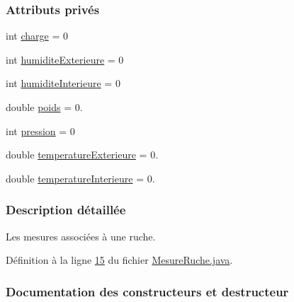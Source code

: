 \subsubsection*{Attributs privés}
\begin{DoxyCompactItemize}
\item 
int \hyperlink{classcom_1_1example_1_1bee__honeyt_1_1_mesure_ruche_a5ac02bc1d6195faa400e5a3171eed3f4}{charge} = 0
\item 
int \hyperlink{classcom_1_1example_1_1bee__honeyt_1_1_mesure_ruche_aa5521e97dfa98051bff9fd8d3ca3f34d}{humidite\+Exterieure} = 0
\item 
int \hyperlink{classcom_1_1example_1_1bee__honeyt_1_1_mesure_ruche_a3b5d2536649e0acaf1eebeba4409c9bb}{humidite\+Interieure} = 0
\item 
double \hyperlink{classcom_1_1example_1_1bee__honeyt_1_1_mesure_ruche_a9aa6c575b7b69c4fb3825944e1f50722}{poids} = 0.
\item 
int \hyperlink{classcom_1_1example_1_1bee__honeyt_1_1_mesure_ruche_ae78080a6d5745faa411e3cfbdbf8aeec}{pression} = 0
\item 
double \hyperlink{classcom_1_1example_1_1bee__honeyt_1_1_mesure_ruche_ac13ff0ed6c96cf755097510acf202521}{temperature\+Exterieure} = 0.
\item 
double \hyperlink{classcom_1_1example_1_1bee__honeyt_1_1_mesure_ruche_afd0ecabb4e519d5bcfee33ac15b8b742}{temperature\+Interieure} = 0.
\end{DoxyCompactItemize}


\subsubsection{Description détaillée}
Les mesures associées à une ruche. 

Définition à la ligne \hyperlink{_mesure_ruche_8java_source_l00015}{15} du fichier \hyperlink{_mesure_ruche_8java_source}{Mesure\+Ruche.\+java}.



\subsubsection{Documentation des constructeurs et destructeur}
\mbox{\label{classcom_1_1example_1_1bee__honeyt_1_1_mesure_ruche_a3be117936bbcf591ae1a48b6c391f069}} 
